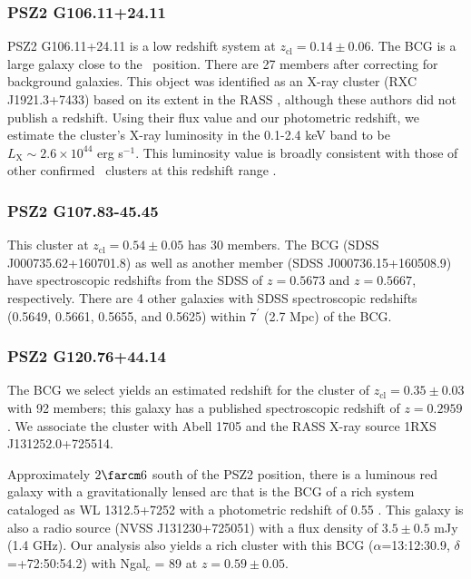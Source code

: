 \documentclass[apj, revtex4-1]{emulateapj}
\begin{document}
\subsubsection{PSZ2 G106.11+24.11} %
PSZ2 G106.11+24.11 is a low redshift system at $z_\mathrm{cl} = 0.14 \pm 0.06$. The BCG is a large galaxy close to the \planck\ position. There are 27 members after correcting for background galaxies. This object was identified as an X-ray cluster (RXC J1921.3+7433) based on its extent in the RASS \citep{Bohringer2000}, although these authors did not publish a redshift. Using their flux value and our photometric redshift, we estimate the cluster's X-ray luminosity in the 0.1-2.4 keV band to be $L_\mathrm{X} \sim 2.6\times 10^{44}$ erg s$^{-1}$. This luminosity value is broadly consistent with those of other confirmed \planck\ clusters at this redshift range \citep{PlanckCollaboration2015}.

\subsubsection{PSZ2 G107.83-45.45} %
This cluster at $z_\mathrm{cl} = 0.54 \pm 0.05$ has 30 members. The BCG (SDSS J000735.62+160701.8) as well as another member (SDSS J000736.15+160508.9) have spectroscopic redshifts from the SDSS of $z=0.5673$ and $z=0.5667$, respectively. There are 4 other galaxies with SDSS spectroscopic redshifts (0.5649, 0.5661, 0.5655, and 0.5625) within $7^\prime$ (2.7 Mpc) of the BCG.

\subsubsection{PSZ2 G120.76+44.14} %
The BCG we select yields an estimated redshift for the cluster of $z_\mathrm{cl} = 0.35 \pm 0.03$ with 92 members; this galaxy has a published spectroscopic redshift of $z=0.2959$ \citep{Huchra1990}. We associate the cluster with Abell 1705 and the RASS X-ray source 1RXS J131252.0+725514.

Approximately $2\farcm6$ south of the PSZ2 position, there is a luminous red galaxy with a gravitationally lensed arc that is the BCG of a rich system cataloged as WL 1312.5+7252 with a photometric redshift of 0.55 \citep{Dahle2003}. This galaxy is also a radio source (NVSS J131230+725051) with a flux density of $3.5 \pm 0.5$ mJy (1.4 GHz). Our analysis also yields a rich cluster with this BCG ($\alpha$=13:12:30.9, $\delta$=+72:50:54.2) with Ngal$_c$ = 89 at $z=0.59 \pm 0.05$.
\end{document}
